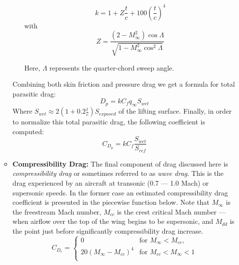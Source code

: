 \documentclass{article}
\begin{document}
\begin{itemize}
\begin{itemize}
\begin{itemize}
                    \begin{equation}
                    k = 1 + Z \frac{t}{c} + 100{\left(\frac{t}{c}\right)}^4                    
                    \end{equation}
                    with
                    \begin{equation}
                    Z = \frac{\left(2-M_{\infty}^2\right)\cos{\Lambda}}{\sqrt{1-M_{\infty}^2\cos^2{\Lambda}}}
                    \end{equation}
                    
                    Here, $\Lambda$ represents the quarter-chord sweep angle. 




                \end{itemize}
            
            Combining both skin friction and pressure drag we get a formula for total parasitic drag:
            \begin{equation}
            D_p = kC_f q_{\infty}S_{wet}
            \end{equation}
            Where $S_{wet} \approx 2\left(1 + 0.2 \frac{t}{c}\right)S_{exposed}$ of the lifting surface. Finally, in order to normalize this total parasitic drag, the following coefficient is computed:
            \begin{equation}
            C_{D_p} = k C_f \frac{S_{wet}}{S_{ref}}
            \end{equation}
            

            \item \textbf{Compressibility Drag:} The final component of drag discussed here is \textit{compressibility drag} or sometimes referred to as \textit{wave drag}. This is the drag
            experienced by an aircraft at transonic (0.7 --- 1.0 Mach) or supersonic speeds. In the former case an estimated compressibility drag coefficient is presented in the piecewise function below. Note that
            $M_{\infty}$ is the freestream Mach number, $M_{cc}$ is the crest critical Mach number --- when airflow over the top of the wing begins to be supersonic, and $M_{dd}$ is the point just before significantly
            compressibility drag increase.
            \begin{equation}
            C_{D_c} = \begin{cases}
            0 & \text{for } M_{\infty} <  M_{cc},\\
            20{(M_{\infty} - M_{cc})}^4  & \text{for } M_{cc} < M_{\infty} < 1\\
            \end{cases}
            \end{equation}


\end{itemize}
\end{itemize}
\end{document}
